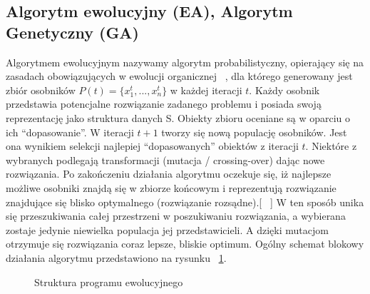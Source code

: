 \documentclass[twoside,a4paper,10]{book}
\begin{document}
    \subsection{ Algorytm ewolucyjny (EA), Algorytm Genetyczny (GA)}
Algorytmem ewolucyjnym nazywamy algorytm probabilistyczny, opierający się na zasadach obowiązujących w ewolucji organicznej  ~\cite{genAlgWeb}, dla którego generowany jest zbiór osobników $P(t)=\lbrace x_1^t, ..., x_n^t\rbrace$ w każdej iteracji $t$. Każdy osobnik przedstawia potencjalne rozwiązanie zadanego problemu i posiada swoją reprezentację jako struktura danych S. Obiekty zbioru oceniane są w oparciu o ich \enquote{dopasowanie}. W iteracji $t+1$ tworzy się nową populację osobników. Jest ona wynikiem selekcji najlepiej \enquote{dopasowanych} obiektów z iteracji $t$. Niektóre z wybranych podlegają transformacji (mutacja / crossing-over) dając nowe rozwiązania. Po zakończeniu działania algorytmu oczekuje się, iż najlepsze możliwe osobniki znajdą się w zbiorze końcowym i reprezentują rozwiązanie znajdujące się blisko optymalnego (rozwiązanie rozsądne).[ ~\cite{algBook}] W ten sposób unika się przeszukiwania całej przestrzeni w poszukiwaniu rozwiązania, a wybierana zostaje jedynie niewielka populacja jej przedstawicieli. A dzięki mutacjom otrzymuje się rozwiązania coraz lepsze, bliskie optimum.  Ogólny schemat blokowy działania algorytmu przedstawiono na rysunku ~\ref{fig:algSchem}.

\begin{figure}[!h]
		\centering
		\caption{Struktura programu ewolucyjnego}
		\label{fig:algSchem}
\end{figure}
\end{document}
